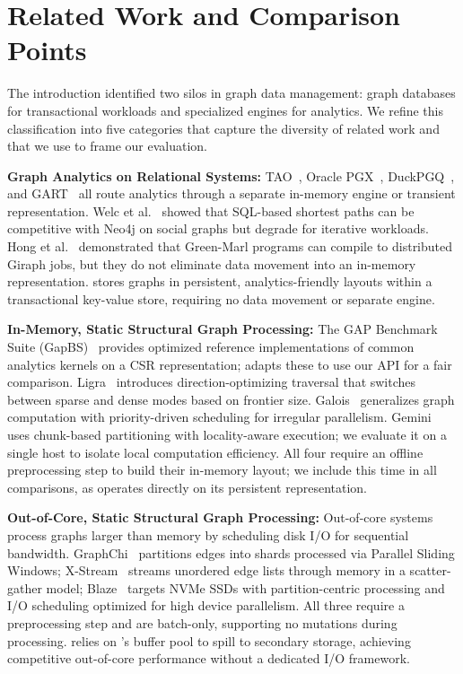 \section{Related Work and Comparison Points}
\label{sec:related-work}
The introduction identified two silos in graph data management: graph databases for transactional workloads and specialized engines for analytics. We refine this classification into five categories that capture the diversity of related work and that we use to frame our evaluation.

\textbf{Graph Analytics on Relational Systems:}
TAO~\cite{bronson2013tao}, Oracle PGX~\cite{hong2015pgx,OraclePG,WhatIsOracleSpatialGraph:online}, DuckPGQ~\cite{duckpgq:online}, and GART~\cite{shen2023bridging} all route analytics through a separate in-memory engine or transient representation.
Welc et al.~\cite{welc2013graph,graphProcessingRDBMS} showed that SQL-based shortest paths can be competitive with Neo4j on social graphs but degrade for iterative workloads.
Hong et al.~\cite{hong2013early} demonstrated that Green-Marl programs can compile to distributed Giraph jobs, but they do not eliminate data movement into an in-memory representation.
\project{} stores graphs in persistent, analytics-friendly layouts within a transactional key-value store, requiring no data movement or separate engine.

\textbf{In-Memory, Static Structural Graph Processing:}
The GAP Benchmark Suite (GapBS)~\cite{beamer2015gap} provides optimized reference implementations of common analytics kernels on a CSR representation; \project{} adapts these to use our API for a fair comparison.
Ligra~\cite{shun2013ligra} introduces direction-optimizing traversal that switches between sparse and dense modes based on frontier size.
Galois~\cite{nguyen2013lightweight} generalizes graph computation with priority-driven scheduling for irregular parallelism.
Gemini~\cite{zhu2016gemini} uses chunk-based partitioning with locality-aware execution; we evaluate it on a single host to isolate local computation efficiency.
All four require an offline preprocessing step to build their in-memory layout; we include this time in all comparisons, as \project{} operates directly on its persistent representation.

\textbf{Out-of-Core, Static Structural Graph Processing:}
Out-of-core systems process graphs larger than memory by scheduling disk I/O for sequential bandwidth.
GraphChi~\cite{kyrola2012graphchi} partitions edges into shards processed via Parallel Sliding Windows;
X-Stream~\cite{roy2013x} streams unordered edge lists through memory in a scatter-gather model;
Blaze~\cite{kim2022blaze} targets NVMe SSDs with partition-centric processing and I/O scheduling optimized for high device parallelism.
All three require a preprocessing step and are batch-only, supporting no mutations during processing.
\project{} relies on \wt{}'s buffer pool to spill to secondary storage, achieving competitive out-of-core performance without a dedicated I/O framework.

